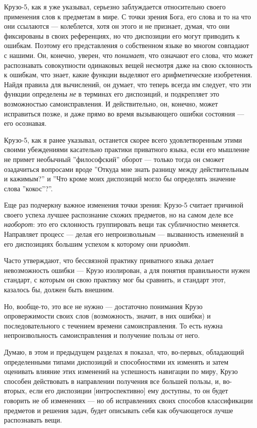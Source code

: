 \documentclass[11pt]{book}
\begin{document}
Крузо-5, как я уже указывал, серьезно заблуждается относительно своего применения слов к предметам в мире. С точки зрения Бога, его слова и то на что они ссылаются --- колеблется, хотя он этого и не признает, думая, что они фиксированы в своих референциях, но что диспозиции его могут приводить к ошибкам. Поэтому его представления о собственном языке во многом совпадают с нашими. Он, конечно, уверен, что \textit{понимает}, что означают его слова, что может распознавать совокупности одинаковых вещей несмотря даже на свою склонность к ошибкам, что знает, какие функции выделяют его арифметические изобретения. Найдя правила для вычислений, он думает, что теперь всегда им следует, что эти функции определены \textit{не} в терминах его диспозиций, и подкрепляет это возможностью самоисправления. И действительно, он, конечно, может исправиться позже, и даже прямо во время вызывающего ошибки состояния --- его осознавая.

Крузо-5, как я ранее указывал, останется скорее всего удовлетворенным этими своими убеждениями касательно практики приватного языка, если его мышление не примет необычный ''философский'' оборот --- только тогда он сможет озадачиться вопросами вроде ''Откуда мне знать разницу между действительным и кажимым?'' и ''Что кроме моих диспозиций могло бы определять значение слова ''кокос''?''.

Еще раз подчеркну важное изменения точки зрения: Крузо-5 считает причиной своего успеха лучшее распознание схожих предметов, но на самом деле все \textit{наоборот}: это его склонность группировать вещи так субличностно меняется. Направляет процесс --- делая его непроизвольным --- вызванность изменений в его диспозициях большим успехом к которому они \textit{приводят}.

Часто утверждают, что бессвязной практику приватного языка делает невозможность ошибки --- Крузо изолирован, а для понятия правильности нужен стандарт, с которым он свою практику мог бы сравнить, и стандарт этот, казалось бы, должен быть внешним.

Но, вообще-то, это все не нужно --- достаточно понимания Крузо опровержимости своих слов (возможность, значит, в них ошибки) и последовательного с течением времени самоисправления. То есть нужна непроизвольность самоисправления и получение пользы от него.

Думаю, в этом и предыдущем разделах я показал, что, во-первых, обладающий определенными типами диспозиций и способностями их изменять и затем оценивать влияние этих изменений на успешность навигации по миру, Крузо способен действовать в направлении получения все большей пользы, и, во-вторых, если его диспозиции [интроспективно] ему доступны, то он будет говорить не об изменениях --- но об исправлениях своих способов классификации предметов и решения задач, будет описывать себя как обучающегося лучше распознавать вещи.
\end{document}
